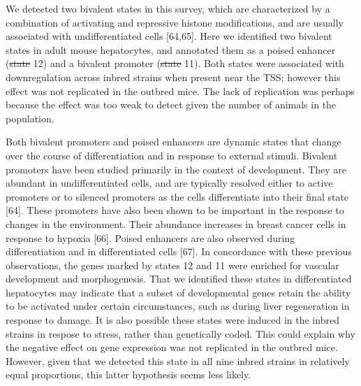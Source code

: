 \documentclass[10pt,letterpaper]{article}
\providecommand{\DIFaddtex}[1]{{\protect\color{blue}\uwave{#1}}} %
\providecommand{\DIFdeltex}[1]{{\protect\color{red}\sout{#1}}}                      %
\providecommand{\DIFaddbegin}{} %
\providecommand{\DIFaddend}{} %
\providecommand{\DIFdelbegin}{} %
\providecommand{\DIFdelend}{} %
\providecommand{\DIFadd}[1]{\texorpdfstring{\DIFaddtex{#1}}{#1}} %
\providecommand{\DIFdel}[1]{\texorpdfstring{\DIFdeltex{#1}}{}} %
\newcommand{\DIFscaledelfig}{0.5}
\newlength{\DIFdelgraphicswidth} %
\newlength{\DIFdelgraphicsheight} %
\newcommand{\DIFaddincludegraphics}[2][]{{\color{blue}\fbox{\DIFOincludegraphics[#1]{#2}}}} %
\newcommand{\DIFdelincludegraphics}[2][]{%
\sbox{\DIFdelgraphicsbox}{\DIFOincludegraphics[#1]{#2}}%
\settoboxwidth{\DIFdelgraphicswidth}{\DIFdelgraphicsbox} %
\settoboxtotalheight{\DIFdelgraphicsheight}{\DIFdelgraphicsbox} %
\scalebox{\DIFscaledelfig}{%
\parbox[b]{\DIFdelgraphicswidth}{\usebox{\DIFdelgraphicsbox}\\[-\baselineskip] \rule{\DIFdelgraphicswidth}{0em}}\llap{\resizebox{\DIFdelgraphicswidth}{\DIFdelgraphicsheight}{%
\setlength{\unitlength}{\DIFdelgraphicswidth}%
\begin{picture}(1,1)%
\thicklines\linethickness{2pt} %
{\color[rgb]{1,0,0}\put(0,0){\framebox(1,1){}}}%
{\color[rgb]{1,0,0}\put(0,0){\line( 1,1){1}}}%
{\color[rgb]{1,0,0}\put(0,1){\line(1,-1){1}}}%
\end{picture}%
}\hspace*{3pt}}} %
} %
\DeclareRobustCommand{\DIFaddbegin}{\DIFOaddbegin \let\includegraphics\DIFaddincludegraphics} %
\DeclareRobustCommand{\DIFaddend}{\DIFOaddend \let\includegraphics\DIFOincludegraphics} %
\DeclareRobustCommand{\DIFdelbegin}{\DIFOdelbegin \let\includegraphics\DIFdelincludegraphics} %
\DeclareRobustCommand{\DIFdelend}{\DIFOaddend \let\includegraphics\DIFOincludegraphics} %
\begin{document}
We detected two bivalent states in this survey, which are characterized
by a combination of activating and repressive histone modifications, and
are usually associated with undifferentiated cells {[}64,65{]}. Here we
identified two bivalent states in adult mouse hepatocytes, and annotated
them as a poised enhancer (\DIFdelbegin \DIFdel{state }\DIFdelend \DIFaddbegin \DIFadd{State }\DIFaddend 12) and a bivalent promoter (\DIFdelbegin \DIFdel{state }\DIFdelend \DIFaddbegin \DIFadd{State }\DIFaddend 11).
Both states were associated with downregulation across inbred strains
when present near the TSS; however this effect was not replicated in the
outbred mice. The lack of replication was perhaps because the effect was
too weak to detect given the number of animals in the population.

Both bivalent promoters and poised enhancers are dynamic states that
change over the course of differentiation and in response to external
stimuli. Bivalent promoters have been studied primarily in the context
of development. They are abundant in undifferentiated cells, and are
typically resolved either to active promoters or to silenced promoters
as the cells differentiate into their final state {[}64{]}. These
promoters have also been shown to be important in the response to
changes in the environment. Their abundance increases in breast cancer
cells in response to hypoxia {[}66{]}. Poised enhancers are also
observed during differentiation and in differentiated cells {[}67{]}. In
concordance with these previous observations, the genes marked by states
12 and 11 were enriched for vascular development and morphogenesis. That
we identified these states in differentiated hepatocytes may indicate
that a subset of developmental genes retain the ability to be activated
under certain circumstances, such as during liver regeneration in
response to damage. It is also possible these states were induced in the
inbred strains in respose to stress, rather than genetically coded. This
could explain why the negative effect on gene expression was not
replicated in the outbred mice. However, given that we detected this
state in all nine inbred strains in relatively equal proportions, this
latter hypothesis seems less likely.
\end{document}
